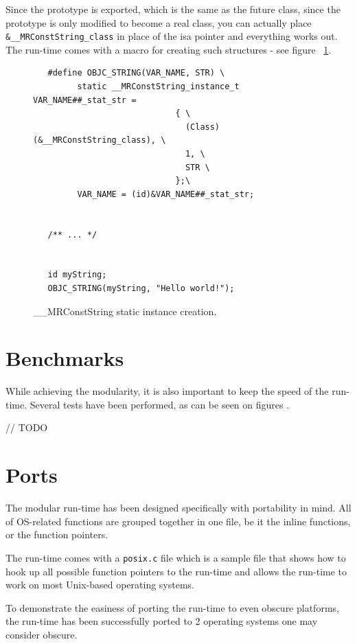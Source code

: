 Since the prototype is exported, which is the same as the future class, since the prototype is only modified to become a real class, you can actually place \verb=&__MRConstString_class= in place of the isa pointer and everything works out. The run-time comes with a macro for creating such structures - see figure ~\ref{fig:mr_const_str_creation}.

\begin{figure}
  \begin{verbatim}
   #define OBJC_STRING(VAR_NAME, STR) \
         static __MRConstString_instance_t VAR_NAME##_stat_str = 
                             { \
                               (Class)(&__MRConstString_class), \
                               1, \
                               STR \
                             };\
         VAR_NAME = (id)&VAR_NAME##_stat_str;


   /** ... */
   
 
   id myString;
   OBJC_STRING(myString, "Hello world!");
   \end{verbatim}
  \centering{}
  \caption{\_\_MRConstString static instance creation.}
  \label{fig:mr_const_str_creation}
\end{figure}

\section{Benchmarks}

While achieving the modularity, it is also important to keep the speed of the run-time. Several tests have been performed, as can be seen on figures .

// TODO

\section{Ports}

The modular run-time has been designed specifically with portability in mind. All of OS-related functions are grouped together in one file, be it the inline functions, or the function pointers.

The run-time comes with a \verb=posix.c= file which is a sample file that shows how to hook up all possible function pointers to the run-time and allows the run-time to work on most Unix-based operating systems.

To demonstrate the easiness of porting the run-time to even obscure platforms, the run-time has been successfully ported to 2 operating systems one may consider obscure.

